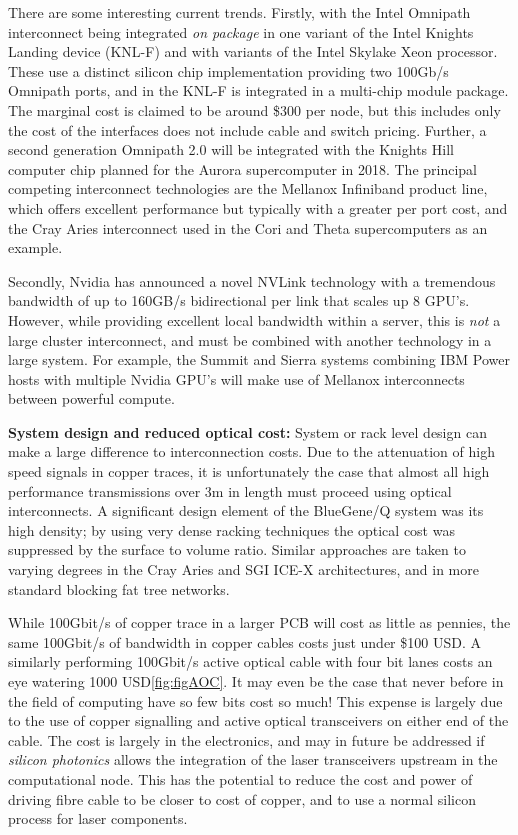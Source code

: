 \documentclass{PoS}
\begin{document}
There are some interesting current trends. Firstly, with the Intel Omnipath interconnect being integrated
\emph{on package} in one variant of the Intel Knights Landing device (KNL-F) and with variants of the
Intel Skylake Xeon processor. These use a distinct silicon chip implementation providing two 100Gb/s Omnipath
ports, and in the KNL-F is integrated in a multi-chip module package. The marginal cost is claimed to be around \$300 per node,
but this includes only the cost of the interfaces does not include cable and switch pricing. Further, a second generation
Omnipath 2.0 will be integrated with the Knights Hill computer chip planned for the Aurora supercomputer in 2018.
The principal competing interconnect technologies are the Mellanox Infiniband product line, which offers excellent performance but
typically with a greater per port cost, and the Cray Aries interconnect used in the Cori and Theta supercomputers as an example.

Secondly, Nvidia has announced a novel NVLink technology with a tremendous bandwidth of up to 
160GB/s bidirectional per link that scales up 8 GPU's. However, while providing excellent
local bandwidth within a server, this is \emph{not} a large cluster interconnect, and must be combined
with another technology in a large system. For example, the Summit and Sierra systems combining IBM Power hosts
with multiple Nvidia GPU's will make use of Mellanox interconnects between powerful compute.

{\bf System design and reduced optical cost:}
System or rack level design can make a large difference to interconnection costs.
Due to the attenuation of high speed signals in copper traces, it is unfortunately the case that 
almost all high performance transmissions over 3m in length must proceed using optical interconnects.
A significant design element of the BlueGene/Q system was its high density; by using very dense
racking techniques the optical cost was suppressed by the surface to volume ratio. Similar approaches
are taken to varying degrees in the Cray Aries and SGI ICE-X architectures, and in more standard blocking
fat tree networks.

While 100Gbit/s of copper trace in a larger PCB will cost as little as pennies, the same
100Gbit/s of bandwidth in copper cables costs just under \$100 USD. A similarly performing 100Gbit/s 
active optical cable with four bit lanes costs an eye watering 1000 USD\ref{fig:figAOC}. It may even be the case that
never before in the field of computing have so few bits cost so much!
This  expense is largely due to the use of copper signalling and active optical transceivers on either end of the cable.
The cost is largely in the electronics, and may in future be addressed if \emph{silicon photonics} allows the integration
of the laser transceivers upstream in the computational node.
This has the potential to reduce the cost and power of driving fibre cable to be closer to cost of copper, and to use a normal silicon process for laser components.
\end{document}
